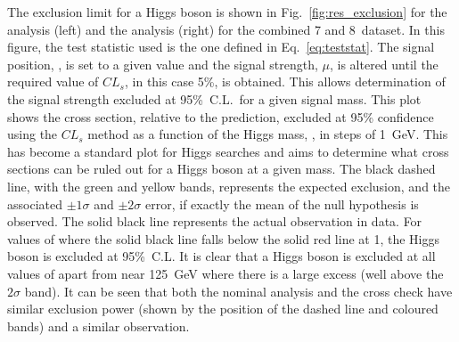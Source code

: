 The exclusion limit for a \SM Higgs boson is shown in Fig.~\ref{fig:res_exclusion} for the \MFM analysis (left) and the \SMVA analysis (right) for the combined 7 and 8~\TeV dataset. In this figure, the test statistic used is the one defined in Eq.~\ref{eq:teststat}. The signal position, \mH, is set to a given value and the signal strength, $\mu$, is altered until the required value of $CL_{s}$, in this case 5\%, is obtained. This allows determination of the signal strength excluded at 95\%~C.L.~for a given signal mass. This plot shows the cross section, relative to the \SM prediction, excluded at 95\% confidence using the $CL_{s}$ method as a function of the Higgs mass, \mH, in steps of 1~GeV. This has become a standard plot for Higgs searches and aims to determine what cross sections can be ruled out for a Higgs boson at a given mass. The black dashed line, with the green and yellow bands, represents the expected exclusion, and the associated $\pm1\sigma$ and $\pm2\sigma$ error, if exactly the mean of the null hypothesis is observed. The solid black line represents the actual observation in data. For values of \mH where the solid black line falls below the solid red line at 1, the \SM Higgs boson is excluded at 95\%~C.L. It is clear that a \SM Higgs boson is excluded at all values of \mH apart from near 125~GeV where there is a large excess (well above the $2\sigma$ band).
It can be seen that both the nominal \MFM analysis and the cross check \SMVA have similar exclusion power (shown by the position of the dashed line and coloured bands) and a similar observation.

